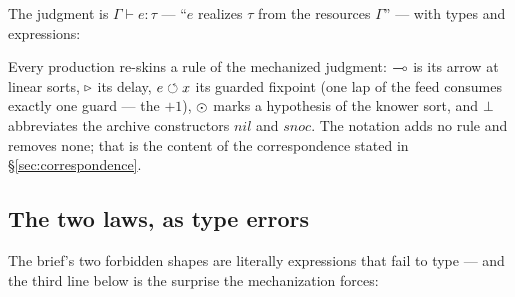 \documentclass{eptcs}
\begin{document}
The judgment is $\Gamma \vdash e : \tau$ --- ``$e$ realizes $\tau$ from
the resources $\Gamma$'' --- with types and expressions:

\begin{center}
\end{center}

Every production re-skins a rule of the mechanized judgment: $\multimap$ is
its arrow at linear sorts, $\triangleright$ its delay, $e \circlearrowleft x$ its guarded
fixpoint (one lap of the feed consumes exactly one guard --- the $+1$),
$\odot$ marks a hypothesis of the knower sort, and $\bot$
abbreviates the archive constructors $\mathit{nil}$ and $\mathit{snoc}$.
The notation adds no rule and removes none; that is the content of the
correspondence stated in \S\ref{sec:correspondence}.

\subsection{The two laws, as type errors}\label{sec:core:laws}

The brief's two forbidden shapes are literally expressions that fail to
type --- and the third line below is the surprise the mechanization
forces:

\begin{center}
\end{center}
\end{document}
